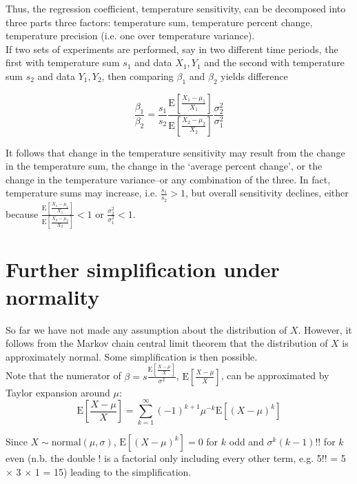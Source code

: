 \documentclass[11pt,letter]{article}
\begin{document}
Thus, the regression coefficient, temperature sensitivity, can be decomposed into three parts three factors: temperature sum, temperature percent change, temperature precision (i.e. one over temperature variance). \\

If two sets of experiments are performed, say in two different time periods, the first with temperature sum $s_1$ and data $X_1, Y_1$ and the second with temperature sum $s_2$ and data $Y_1, Y_2$, then comparing $\beta_1$ and $\beta_2$ yields difference

$$\frac{\beta_1}{\beta_2} =  \frac{s_1}{s_2} \frac{\text{E}\left [\frac{X_1 - \mu_1}{X_1} \right ]}{\text{E} \left [\frac{X_2 - \mu_2}{X_2} \right ]} \frac{\sigma_2^2}{\sigma_1^2}$$

It follows that change in the temperature sensitivity may result from the change in the temperature sum, the change in the `average percent change', or the change in the temperature variance--or any combination of the three. In fact, temperature sums may increase, i.e. $\frac{s_1}{s_2} > 1$, but overall sensitivity declines, either because $\frac{\text{E} \left [\frac{X_1 - \mu_1}{X_1} \right ]}{\text{E} \left [\frac{X_2 - \mu_2}{X_2} \right ]} < 1$ or $\frac{\sigma_2^2}{\sigma_1^2} < 1$. \\

\section{Further simplification under normality}

So far we have not made any assumption about the distribution of $X$. However, it follows from the Markov chain central limit theorem that the distribution of $X$ is approximately normal. Some simplification is then possible. \\

Note that the numerator of $\beta = s \frac{\text{E}\left [ \frac{X - \mu}{X} \right ] }{\sigma^2}$, $\text{E}\left [ \frac{X - \mu}{X} \right ]$, can be approximated by Taylor expansion around $\mu$: $$\text{E} \left  [\frac{X - \mu}{X} \right ] = \sum_{k=1}^{\infty} (-1)^{k+1} \mu^{-k} \text{E}[(X-\mu)^k]$$ 

Since $X \sim \text{normal}(\mu, \sigma)$, $\text{E}[(X-\mu)^k] = 0$ for $k$ odd and $\sigma^k (k-1)!!$ for $k$ even (n.b. the double ! is a factorial only including every other term, e.g. 5!! = 5 $\times$ 3 $\times$ 1 = 15) leading to the simplification.
\end{document}
